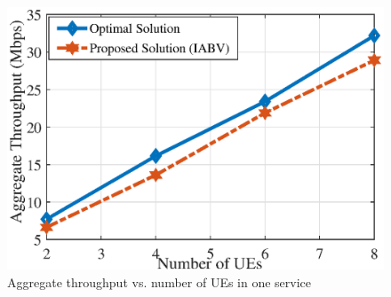\documentclass[lettersize,journal]{IEEEtran}
\begin{document}
\begin{figure}%
  \centering
   \includegraphics[scale = 0.5]{fig/optimal1n.eps}
  \caption{Aggregate throughput vs. number of UEs in one service}
  \label{fig:12}
\end{figure}

\end{document}
